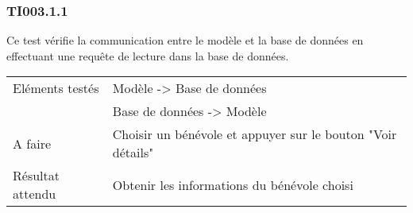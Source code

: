 
\subsubsection{TI003.1.1}
\label{TI003.1.1}
  		Ce test vérifie la communication entre le modèle et la base de données en effectuant une requête de lecture dans la base de données.
  		\begin{center}
    	 		\begin{tabular}[h]{|p{}|p{}|}
			\hline
				Eléments testés & Modèle -> Base de données  \\
							    &  Base de données -> Modèle \\\hline
    				A faire & Choisir un bénévole et appuyer sur le bouton "Voir détails" \\\hline
    				Résultat attendu & Obtenir les informations du bénévole choisi \\\hline
     		\end{tabular}
  		\end{center}	
